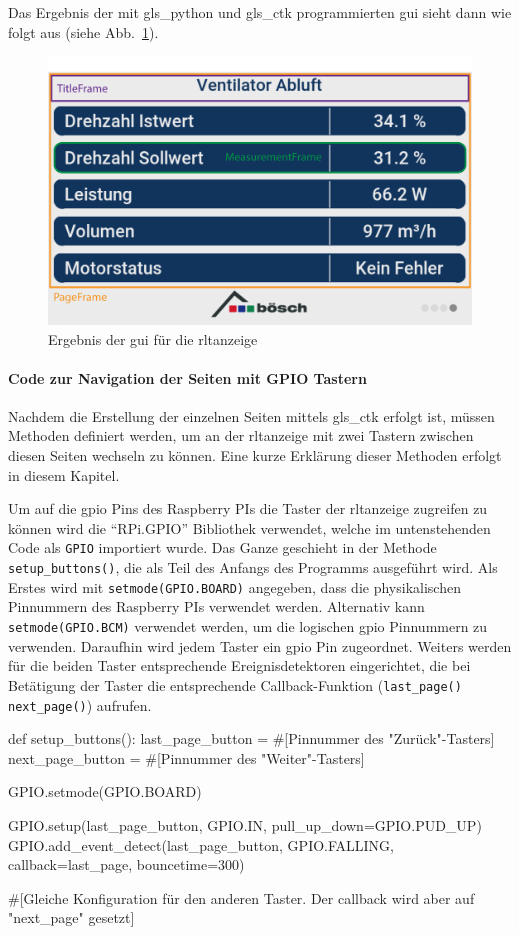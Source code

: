 Das Ergebnis der mit \gls{gls_python} und \gls{gls_ctk} programmierten \ac{gui} sieht dann wie folgt aus (siehe Abb.~\ref{fig:ctk_gui}).
\begin{figure}[H]
    \centering
    \includegraphics[width=0.75\linewidth]{Bilder/CTK_components.png}
    \caption{Ergebnis der \ac{gui} für die \ac{rltanzeige}}
    \label{fig:ctk_gui}
\end{figure}

\paragraph{Code zur Navigation der Seiten mit GPIO Tastern} \label{gpio_taster}

Nachdem die Erstellung der einzelnen Seiten mittels \gls{gls_ctk} erfolgt ist, müssen Methoden definiert werden, um an der \acs{rltanzeige} mit zwei Tastern zwischen diesen Seiten wechseln zu können. Eine kurze Erklärung dieser Methoden erfolgt in diesem Kapitel.

Um auf die \ac{gpio} Pins des Raspberry PIs \bzw die Taster der \acs{rltanzeige} zugreifen zu können wird die \enquote{RPi.GPIO} Bibliothek verwendet, welche im untenstehenden Code als \lstinline{GPIO} importiert wurde. Das Ganze geschieht in der Methode \lstinline{setup_buttons()}, die als Teil des Anfangs des Programms ausgeführt wird.
Als Erstes wird mit \lstinline{setmode(GPIO.BOARD)} angegeben, dass die physikalischen Pinnummern des Raspberry PIs verwendet werden. Alternativ kann \lstinline{setmode(GPIO.BCM)} verwendet werden, um die logischen \ac{gpio} Pinnummern zu verwenden. Daraufhin wird jedem Taster ein \ac{gpio} Pin zugeordnet. Weiters werden für die beiden Taster entsprechende Ereignisdetektoren eingerichtet, die bei Betätigung der Taster die entsprechende Callback-Funktion (\lstinline{last_page()} \bzw \lstinline{next_page()}) aufrufen.

\begin{pythoncode}
def setup_buttons():
    last_page_button = #[Pinnummer des "Zurück"-Tasters]
    next_page_button = #[Pinnummer des "Weiter"-Tasters]

    GPIO.setmode(GPIO.BOARD)
    
    GPIO.setup(last_page_button, GPIO.IN, pull_up_down=GPIO.PUD_UP)
    GPIO.add_event_detect(last_page_button, GPIO.FALLING, callback=last_page, bouncetime=300)

    #[Gleiche Konfiguration für den anderen Taster. Der callback wird aber auf "next_page" gesetzt]
\end{pythoncode}

